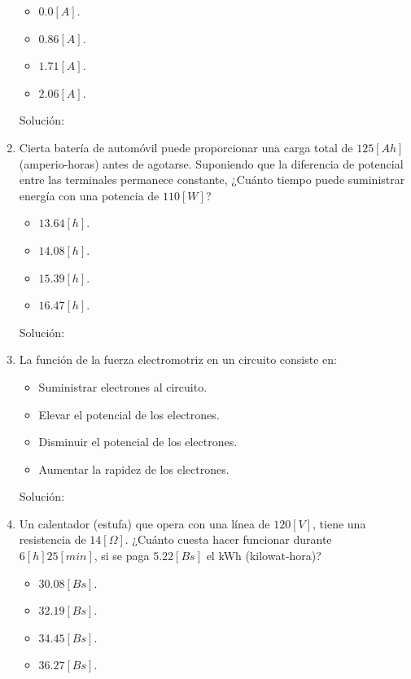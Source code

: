 \documentclass[letter,11pt]{article}
\begin{document}
\begin{enumerate}
\begin{itemize}
    \item $0.0  [A]$.
    \item $0.86 [A]$.
    \item $1.71 [A]$.
    \item $2.06 [A]$.
\end{itemize}

Solución: \\

\item Cierta batería de automóvil puede proporcionar una carga total de
$125 [Ah]$ (amperio-horas) antes de agotarse. Suponiendo que la diferencia de
potencial entre las terminales permanece constante, ¿Cuánto tiempo puede
suministrar energía con una potencia de $110 [W]$?

\begin{itemize}
    \item $13.64 [h]$.
    \item $14.08 [h]$.
    \item $15.39 [h]$.
    \item $16.47 [h]$.
\end{itemize}

Solución: \\

\item La función de la fuerza electromotriz en un circuito consiste en:

\begin{itemize}
    \item Suministrar electrones al circuito.
    \item Elevar el potencial de los electrones.
    \item Disminuir el potencial de los electrones.
    \item Aumentar la rapidez de los electrones.
\end{itemize}

Solución: \\

\item Un calentador (estufa) que opera con una línea de $120 [V]$, tiene una
resistencia de $14 [\Omega]$. ¿Cuánto cuesta hacer funcionar durante
$6 [h] 25 [min]$, si se paga $5.22 [Bs]$ el kWh (kilowat-hora)?

\begin{itemize}
    \item $30.08 [Bs]$.
    \item $32.19 [Bs]$.
    \item $34.45 [Bs]$.
    \item $36.27 [Bs]$.
\end{itemize}


\end{enumerate}
\end{document}
